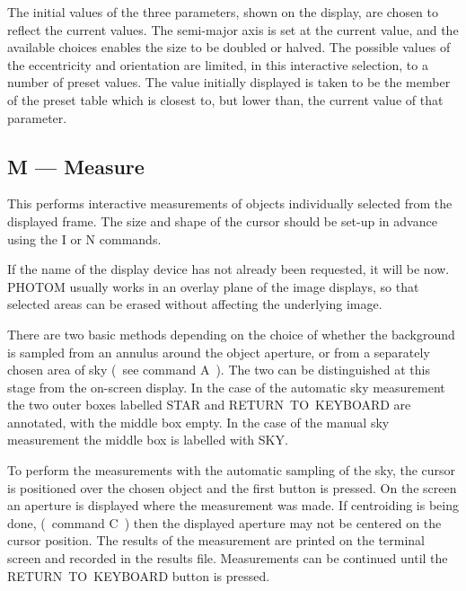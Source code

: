 The initial values of the three parameters, shown on the display, are
chosen to reflect the current values. The semi-major axis is set at the
current value, and the available choices enables the size to be doubled
or halved. The possible values of the eccentricity and orientation are
limited, in this interactive selection, to a number of preset values.
The value initially displayed is taken to be the member of the preset
table which is closest to, but lower than, the current value of that
parameter.

\subsection{M --- Measure}

This performs interactive measurements of objects individually selected
from the displayed frame. The size and shape of the cursor should be
set-up in advance using the I or N commands.

If the name of the display device has not already been requested, it will
be now. PHOTOM usually works in an overlay plane of the image displays, so
that selected areas can be erased without affecting the underlying image.

There are two basic methods depending on the choice of whether the
background is sampled from an annulus around the object aperture, or from
a separately chosen area of sky (~see command A~). The two can be
distinguished at this stage from the on-screen display. In the case of
the automatic sky measurement the two outer boxes labelled STAR and
RETURN~TO~KEYBOARD are annotated, with the middle box empty. In the case
of the manual sky measurement the middle box is labelled with SKY.

To perform the measurements with the automatic sampling of the sky, the
cursor is positioned over the chosen object and the first button is
pressed. On the screen an aperture is displayed where the measurement
was made. If centroiding is being done, (~command C~) then the displayed
aperture may not be centered on the cursor position. The results of the
measurement are printed on the terminal screen and recorded in the
results file. Measurements can be continued until the RETURN~TO~KEYBOARD
button is pressed.

